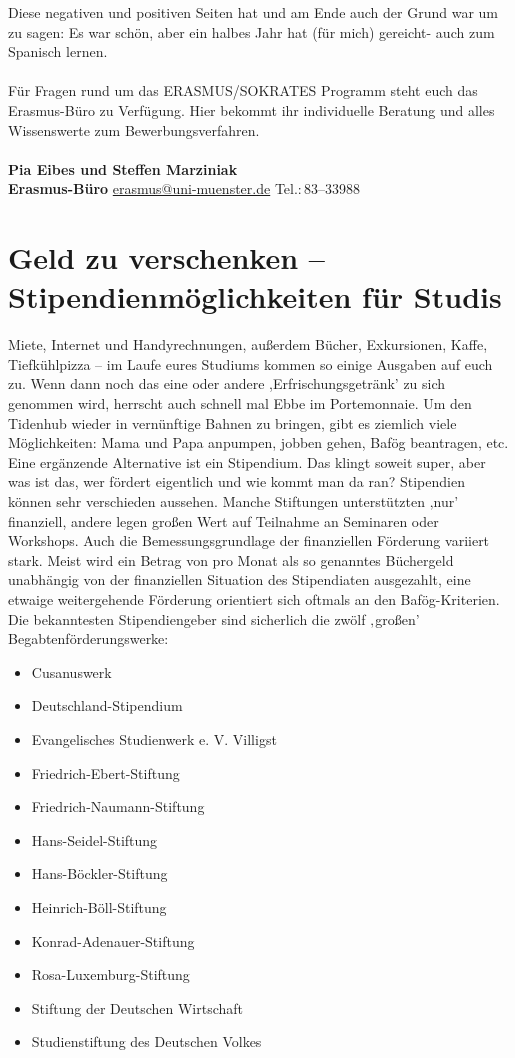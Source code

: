 Diese negativen und positiven Seiten hat und am Ende auch der Grund war um zu sagen: Es war schön, aber ein halbes Jahr hat (für mich) gereicht- auch zum Spanisch lernen. 
 \\
\\
Für Fragen rund um das ERASMUS/SOKRATES Programm steht euch das Erasmus-Büro zu Verfügung. Hier bekommt ihr individuelle Beratung und alles Wissenswerte zum Bewerbungsverfahren.\\ \\
\textbf{Pia Eibes und Steffen Marziniak}\\
\textbf{Erasmus-Büro}   \url{erasmus@uni-muenster.de}	Tel.:\,83--33988\\ 

\section{Geld zu verschenken – Stipendienmöglichkeiten für Studis}
Miete, Internet und Handyrechnungen, außerdem Bücher, Exkursionen, Kaffe, Tiefkühlpizza – im Laufe eures Studiums kommen so einige Ausgaben auf euch zu. Wenn dann noch das eine oder andere ,Erfrischungsgetränk' zu sich genommen wird, herrscht auch schnell mal Ebbe im Portemonnaie. Um den Tidenhub wieder in vernünftige Bahnen zu bringen, gibt es ziemlich viele Möglichkeiten: Mama und Papa anpumpen, jobben gehen, Bafög beantragen, etc. Eine ergänzende Alternative ist ein Stipendium. Das klingt soweit super, aber was ist das, wer fördert eigentlich und wie kommt man da ran?
Stipendien können sehr verschieden aussehen. Manche Stiftungen unterstützten ‚nur’ finanziell, andere legen großen Wert auf Teilnahme an Seminaren oder Workshops. Auch die Bemessungsgrundlage der finanziellen Förderung variiert stark. Meist wird ein Betrag von \unit[60-100]{\officialeuro} pro Monat als so genanntes Büchergeld unabhängig von der finanziellen Situation des Stipendiaten ausgezahlt, eine etwaige weitergehende Förderung orientiert sich oftmals an den Bafög-Kriterien.
Die bekanntesten Stipendiengeber sind sicherlich die zwölf ‚großen’ Begabtenförderungswerke:
\begin{itemize}
 \item Cusanuswerk
 \item Deutschland-Stipendium
 \item Evangelisches Studienwerk e. V. Villigst
 \item Friedrich-Ebert-Stiftung
 \item Friedrich-Naumann-Stiftung
 \item Hans-Seidel-Stiftung
 \item Hans-Böckler-Stiftung
 \item Heinrich-Böll-Stiftung
 \item Konrad-Adenauer-Stiftung
 \item Rosa-Luxemburg-Stiftung
 \item Stiftung der Deutschen Wirtschaft
 \item Studienstiftung des Deutschen Volkes 
\end{itemize}
